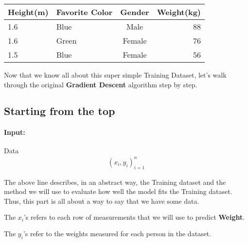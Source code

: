 \documentclass[12pt, a4paper]{article} %
\begin{document}
\begin{table}[h!]
\begin{center}
\begin{tabular}{m|l|c|r} %
    
    \hline
    \hline
    
         \textbf{Height(m)}
     
       & \textbf{Favorite Color}
      
       & \textbf{Gender}
       
       & \textbf{Weight(kg)}
       
      \\
      
      \hline
      \hline
      
      1.6 & Blue  & Male   & 88\\
      1.6 & Green & Female & 76\\
      1.5 & Blue  & Female & 56\\
      
      \hline
      \hline
      
\end{tabular}
\end{center}
\end{table}

Now that we know all about this super simple Training Dataset, let's walk through the original \textbf{Gradient Descent} algorithm step by step.

\subsection{Starting from the top}

\paragraph{Input:} Data
\begin{align*}
    (x_{i}, y_{i})^n_{i = 1}
\end{align*}

The above line describes, in an abstract way, the Training dataset and the method we will use to evaluate how well the model fits the Training dataset. Thus, this part is all about a way to say that we have some data. 


The $x_{i}$'s refers to each row of measurements that we will use to predict \textbf{Weight}.


The $y_{i}$'s refer to the weights measured for each person in the dataset.
\end{document}
